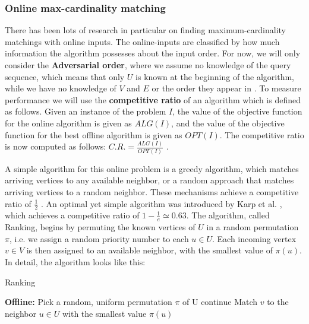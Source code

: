 \subsubsection{Online max-cardinality matching}
There has been lots of research in particular on finding maximum-cardinality matchings with online inputs. The online-inputs are classified by how much information the algorithm possesses about the input order. For now, we will only consider the \textbf{Adversarial order}, where we assume no knowledge of the query sequence, which means that only $U$ is known at the beginning of the algorithm, while we have no knowledge of $V$ and $E$ or the order they appear in \cite{Mehta:Online}. To measure performance we will use the \textbf{competitive ratio} of an algorithm which is defined as follows. Given an instance of the problem $I$, the value of the objective function for the online algorithm is given as $ALG(I)$, and the value of the objective function for the best offline algorithm is given as $OPT(I)$. The competitive ratio is now computed as follows: $C.R.=\frac{ALG(I)}{OPT(I)}$ \cite{Mehta:Online}.

A simple algorithm for this online problem is a greedy algorithm, which matches arriving vertices to any available neighbor, or a random approach that matches arriving vertices to a random neighbor. These mechanisms achieve a competitive ratio of $\frac{1}{2}$ \cite{Mehta:Online}. An optimal yet simple algorithm was introduced by Karp et al. \cite{Karp:Online}, which achieves a competitive ratio of $1 - \frac{1}{e} \simeq 0.63$. The algorithm, called Ranking, begins by permuting the known vertices of $U$ in a random permutation $\pi$, i.e. we assign a random priority number to each $u \in U$. Each incoming vertex $v \in V$ is then assigned to an available neighbor, with the smallest value of $\pi(u)$. In detail, the algorithm looks like this:

\begin{algorithm} %
    \caption{Ranking} 
    \label{alg:ranking} %
    \begin{algorithmic} %
        \State \textbf{Offline:} Pick a random, uniform permutation $\pi$ of U
                \State continue
            \EndIf
            \State Match $v$ to the neighbor $u \in U$ with the smallest value $\pi(u)$
        \EndFor
    \end{algorithmic}
\end{algorithm}